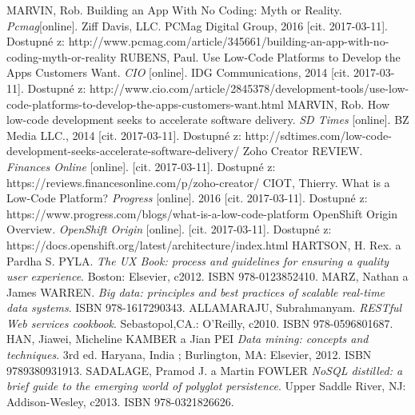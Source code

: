 \begin{thebibliography}{99}

MARVIN, Rob. Building an App With No Coding: Myth or Reality. 
\textit{Pcmag}[online].
 Ziff Davis, LLC. PCMag Digital Group, 2016 [cit. 2017-03-11]. Dostupné z: http://www.pcmag.com/article/345661/building-an-app-with-no-coding-myth-or-reality
RUBENS, Paul. Use Low-Code Platforms to Develop the Apps Customers Want.
\textit{CIO} [online].
IDG Communications, 2014 [cit. 2017-03-11]. Dostupné z: http://www.cio.com/article/2845378/development-tools/use-low-code-platforms-to-develop-the-apps-customers-want.html
MARVIN, Rob. How low-code development seeks to accelerate software delivery.
\textit{SD Times} [online].
BZ Media LLC., 2014 [cit. 2017-03-11]. Dostupné z: http://sdtimes.com/low-code-development-seeks-accelerate-software-delivery/
Zoho Creator REVIEW.
\textit{Finances Online} [online].
[cit. 2017-03-11]. Dostupné z: https://reviews.financesonline.com/p/zoho-creator/
CIOT, Thierry. What is a Low-Code Platform?
\textit{Progress} [online].
2016 [cit. 2017-03-11]. Dostupné z: https://www.progress.com/blogs/what-is-a-low-code-platform
OpenShift Origin Overview.
\textit{OpenShift Origin} [online].
[cit. 2017-03-11]. Dostupné z: https://docs.openshift.org/latest/architecture/index.html
HARTSON, H. Rex. a Pardha S. PYLA.
\textit{The UX Book: process and guidelines for ensuring a quality user experience}. 
Boston: Elsevier, c2012. ISBN 978-0123852410.
MARZ, Nathan a James WARREN.
\textit{Big data: principles and best practices of scalable real-time data systems}. 
ISBN 978-1617290343.
ALLAMARAJU, Subrahmanyam.
\textit{RESTful Web services cookbook}.
Sebastopol,CA.: O'Reilly, c2010. ISBN 978-0596801687.
HAN, Jiawei, Micheline KAMBER a Jian PEI
\textit{Data mining: concepts and techniques}.
3rd ed. Haryana, India ; Burlington, MA: Elsevier, 2012. ISBN 9789380931913.
SADALAGE, Pramod J. a Martin FOWLER
\textit{NoSQL distilled: a brief guide to the emerging world of polyglot persistence}.
Upper Saddle River, NJ: Addison-Wesley, c2013. ISBN 978-0321826626.

\end{thebibliography}
